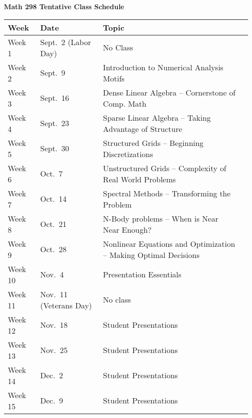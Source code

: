 \documentclass{article}
\begin{document}
\begin{center}

{\bf Math 298 Tentative Class Schedule}

\bigskip

\begin{tabular}{|l|l|l|l|}

  \hline

  {\bf Week} & {\bf Date} & {\bf Topic}\\

  \hline \hline

  Week 1 & Sept.~2 (Labor Day)  & No Class \\
  \hline

  Week 2 & Sept.~9  & Introduction to Numerical Analysis Motifs\\
  \hline

  Week 3 & Sept.~16  & Dense Linear Algebra -- Cornerstone of Comp. Math \\
  \hline

  Week 4 & Sept.~23  & Sparse Linear Algebra -- Taking Advantage of Structure \\
  \hline

  Week 5 & Sept.~30  & Structured Grids -- Beginning Discretizations \\
  \hline

  Week 6 & Oct.~7    & Unstructured Grids -- Complexity of Real World Problems \\
  \hline

  Week 7 & Oct.~14   & Spectral Methods  -- Transforming the Problem \\
  \hline

  Week 8 & Oct.~21   & N-Body problems -- When is Near Near Enough? \\
  \hline

  Week 9 & Oct.~28   & Nonlinear Equations and Optimization -- Making Optimal Decisions \\
  \hline

  Week 10 & Nov.~4    & Presentation Essentials \\
  \hline

  Week 11 & Nov.~11 (Veterans Day) & No class \\
  \hline

  Week 12 & Nov.~18   & Student Presentations\\
  \hline

  Week 13 & Nov.~25   & Student Presentations\\
  \hline

  Week 14 & Dec.~2    & Student Presentations\\
  \hline

  Week 15 & Dec.~9    & Student Presentations\\
  \hline
  
\end{tabular}

\end{center}

\
\end{document}
